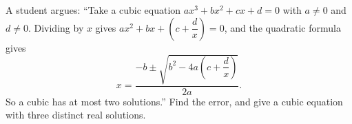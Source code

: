A student argues: ``Take a cubic equation $ax^3+bx^2+cx+d=0$ with $a\ne0$ and $d\ne0$. Dividing by $x$ gives $ax^2+bx+\left(c+\dfrac{d}{x}\right)=0$, and the quadratic formula gives
\[
x=\dfrac{-b\pm\sqrt{b^2-4a\left(c+\dfrac{d}{x}\right)}}{2a}.
\]
So a cubic has at most two solutions.'' Find the error, and give a cubic equation with three distinct real solutions.
